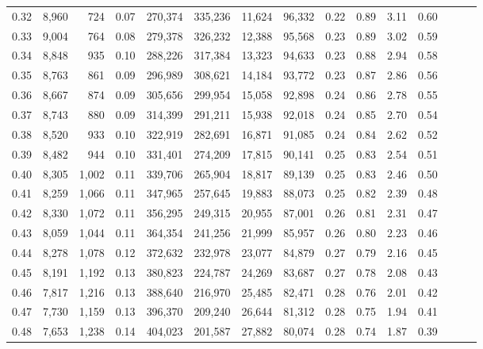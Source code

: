 \begin{tabular}{rrrrrrrrrrrrrrr}
0.32 &  8,960 &    724 &  0.07 &  270,374 &  335,236 &   11,624 &   96,332 &  0.22 &  0.89 &  3.11 &      0.60 \\
0.33 &  9,004 &    764 &  0.08 &  279,378 &  326,232 &   12,388 &   95,568 &  0.23 &  0.89 &  3.02 &      0.59 \\
0.34 &  8,848 &    935 &  0.10 &  288,226 &  317,384 &   13,323 &   94,633 &  0.23 &  0.88 &  2.94 &      0.58 \\
0.35 &  8,763 &    861 &  0.09 &  296,989 &  308,621 &   14,184 &   93,772 &  0.23 &  0.87 &  2.86 &      0.56 \\
0.36 &  8,667 &    874 &  0.09 &  305,656 &  299,954 &   15,058 &   92,898 &  0.24 &  0.86 &  2.78 &      0.55 \\
0.37 &  8,743 &    880 &  0.09 &  314,399 &  291,211 &   15,938 &   92,018 &  0.24 &  0.85 &  2.70 &      0.54 \\
0.38 &  8,520 &    933 &  0.10 &  322,919 &  282,691 &   16,871 &   91,085 &  0.24 &  0.84 &  2.62 &      0.52 \\
0.39 &  8,482 &    944 &  0.10 &  331,401 &  274,209 &   17,815 &   90,141 &  0.25 &  0.83 &  2.54 &      0.51 \\
0.40 &  8,305 &  1,002 &  0.11 &  339,706 &  265,904 &   18,817 &   89,139 &  0.25 &  0.83 &  2.46 &      0.50 \\
0.41 &  8,259 &  1,066 &  0.11 &  347,965 &  257,645 &   19,883 &   88,073 &  0.25 &  0.82 &  2.39 &      0.48 \\
0.42 &  8,330 &  1,072 &  0.11 &  356,295 &  249,315 &   20,955 &   87,001 &  0.26 &  0.81 &  2.31 &      0.47 \\
0.43 &  8,059 &  1,044 &  0.11 &  364,354 &  241,256 &   21,999 &   85,957 &  0.26 &  0.80 &  2.23 &      0.46 \\
0.44 &  8,278 &  1,078 &  0.12 &  372,632 &  232,978 &   23,077 &   84,879 &  0.27 &  0.79 &  2.16 &      0.45 \\
0.45 &  8,191 &  1,192 &  0.13 &  380,823 &  224,787 &   24,269 &   83,687 &  0.27 &  0.78 &  2.08 &      0.43 \\
0.46 &  7,817 &  1,216 &  0.13 &  388,640 &  216,970 &   25,485 &   82,471 &  0.28 &  0.76 &  2.01 &      0.42 \\
0.47 &  7,730 &  1,159 &  0.13 &  396,370 &  209,240 &   26,644 &   81,312 &  0.28 &  0.75 &  1.94 &      0.41 \\
0.48 &  7,653 &  1,238 &  0.14 &  404,023 &  201,587 &   27,882 &   80,074 &  0.28 &  0.74 &  1.87 &      0.39 \\

\end{tabular}
